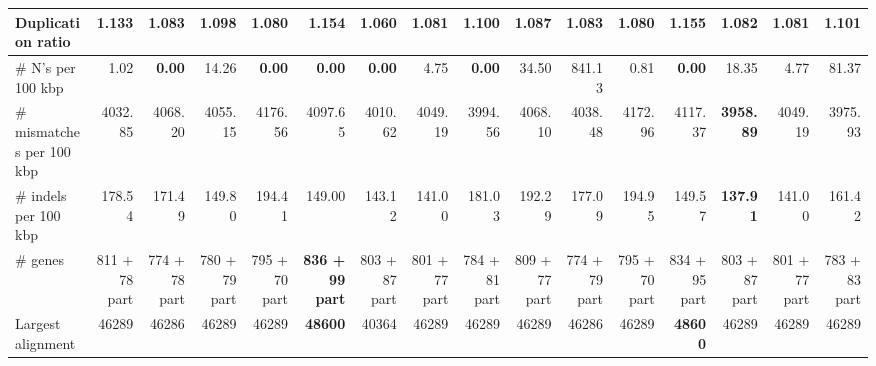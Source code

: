 \documentclass[12pt,a4paper]{article}
\begin{document}
\begin{table}[ht]
\begin{center}
\begin{tabular}{|l*{15}{|r}|}
Duplication ratio & 1.133 & 1.083 & 1.098 & 1.080 & 1.154 & {\bf 1.060} & 1.081 & 1.100 & 1.087 & 1.083 & 1.080 & 1.155 & 1.082 & 1.081 & 1.101 \\ \hline
\# N's per 100 kbp & 1.02 & {\bf 0.00} & 14.26 & {\bf 0.00} & {\bf 0.00} & {\bf 0.00} & 4.75 & {\bf 0.00} & 34.50 & 841.13 & 0.81 & {\bf 0.00} & 18.35 & 4.77 & 81.37 \\ \hline
\# mismatches per 100 kbp & 4032.85 & 4068.20 & 4055.15 & 4176.56 & 4097.65 & 4010.62 & 4049.19 & 3994.56 & 4068.10 & 4038.48 & 4172.96 & 4117.37 & {\bf 3958.89} & 4049.19 & 3975.93 \\ \hline
\# indels per 100 kbp & 178.54 & 171.49 & 149.80 & 194.41 & 149.00 & 143.12 & 141.00 & 181.03 & 192.29 & 177.09 & 194.95 & 149.57 & {\bf 137.91} & 141.00 & 161.42 \\ \hline
\# genes & 811 + 78 part & 774 + 78 part & 780 + 79 part & 795 + 70 part & {\bf 836 + 99 part} & 803 + 87 part & 801 + 77 part & 784 + 81 part & 809 + 77 part & 774 + 79 part & 795 + 70 part & 834 + 95 part & 803 + 87 part & 801 + 77 part & 783 + 83 part \\ \hline
Largest alignment & 46289 & 46286 & 46289 & 46289 & {\bf 48600} & 40364 & 46289 & 46289 & 46289 & 46286 & 46289 & {\bf 48600} & 46289 & 46289 & 46289 \\ \hline
\end{tabular}
\end{center}
\end{table}
\end{document}
